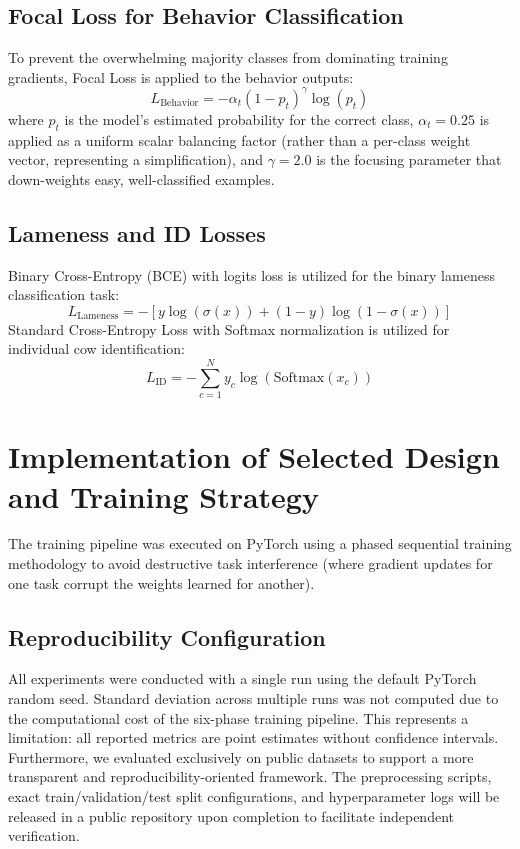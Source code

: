 \subsection{Focal Loss for Behavior Classification}
To prevent the overwhelming majority classes from dominating training gradients, Focal Loss \cite{focalloss2017} is applied to the behavior outputs:
\begin{equation}
    L_{\text{Behavior}} = -\alpha_t (1 - p_t)^\gamma \log(p_t)
\end{equation}
where $p_t$ is the model's estimated probability for the correct class, $\alpha_t = 0.25$ is applied as a uniform scalar balancing factor (rather than a per-class weight vector, representing a simplification), and $\gamma = 2.0$ is the focusing parameter that down-weights easy, well-classified examples.

\subsection{Lameness and ID Losses}
Binary Cross-Entropy (BCE) with logits loss is utilized for the binary lameness classification task:
\begin{equation}
    L_{\text{Lameness}} = - \left[ y \log(\sigma(x)) + (1-y) \log(1-\sigma(x)) \right]
\end{equation}
Standard Cross-Entropy Loss with Softmax normalization is utilized for individual cow identification:
\begin{equation}
    L_{\text{ID}} = - \sum_{c=1}^N y_c \log(\text{Softmax}(x_c))
\end{equation}

\section{Implementation of Selected Design and Training Strategy}
The training pipeline was executed on PyTorch using a phased sequential training methodology to avoid destructive task interference (where gradient updates for one task corrupt the weights learned for another).

\subsection{Reproducibility Configuration}
All experiments were conducted with a single run using the default PyTorch random seed. Standard deviation across multiple runs was not computed due to the computational cost of the six-phase training pipeline. This represents a limitation: all reported metrics are point estimates without confidence intervals. Furthermore, we evaluated exclusively on public datasets to support a more transparent and reproducibility-oriented framework. The preprocessing scripts, exact train/validation/test split configurations, and hyperparameter logs will be released in a public repository upon completion to facilitate independent verification.

